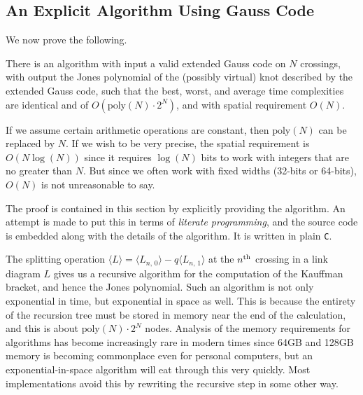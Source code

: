     \subsection{An Explicit Algorithm Using Gauss Code}
        We now prove the following.
        \begin{theorem}
            There is an algorithm with input a valid extended Gauss code on $N$
            crossings, with output the Jones polynomial of the (possibly virtual)
            knot described by the extended Gauss code, such that the best, worst,
            and average time complexities are identical and of
            $O(\textrm{poly}(N)\cdot{2}^{N})$, and with spatial requirement $O(N)$.
        \end{theorem}
        If we assume certain arithmetic operations are constant, then
        $\textrm{poly}(N)$ can be replaced by $N$. If we wish to be very
        precise, the spatial requirement is $O(N\log(N))$ since it requires
        $\log(N)$ bits to work with integers that are no greater than $N$.
        But since we often work with fixed widths (32-bits or 64-bits),
        $O(N)$ is not unreasonable to say.
        \par\hfill\par
        The proof is contained in
        this section by explicitly providing the algorithm. An attempt is made
        to put this in terms of \textit{literate programming}, and the source
        code is embedded along with the details of the algorithm. It is written
        in plain \texttt{C}.
        \par\hfill\par
        The splitting operation
        $\langle{L}\rangle=\langle{L_{n,\,0}}\rangle-q\langle{L_{n,\,1}}\rangle$
        at the $n^{\small\textrm{th}}$ crossing in a link diagram $L$ gives us a
        recursive algorithm for the computation of the Kauffman bracket,
        and hence the Jones polynomial. Such an algorithm is not only
        exponential in time, but exponential in space as well. This is because
        the entirety of the recursion tree must be stored in memory near the
        end of the calculation, and this is about
        $\textrm{poly}(N)\cdot{2}^{N}$ nodes. Analysis of the
        memory requirements for algorithms has become increasingly rare in
        modern times since 64GB and 128GB memory is becoming
        commonplace even for personal computers, but an exponential-in-space
        algorithm will eat through this very quickly. Most implementations
        avoid this by rewriting the recursive step in some other way.

